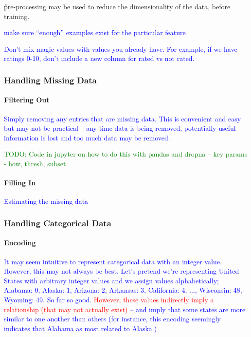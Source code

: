 
\r{pre-processing may be used to reduce the dimensionality of the data, before training.}

\textcolor{blue}{make sure ``enough'' examples exist for the particular feature}

\textcolor{blue}{Don't mix magic values with values you already have. For example, if we have ratings 0-10, don't include a new column for rated vs not rated.}

\subsubsection{Handling Missing Data}

\paragraph{Filtering Out}

\textcolor{blue}{Simply removing any entries that are missing data. This is convenient and easy but may not be practical -- any time data is being removed, potentially useful information is lost and too much data may be removed.}

\textcolor{green}{TODO: Code in jupyter on how to do this with pandas and dropna -- key params - how, thresh, subset}

\paragraph{Filling In}

\textcolor{blue}{Estimating the missing data}

\subsubsection{Handling Categorical Data}

\paragraph{Encoding}

\textcolor{blue}{It may seem intuitive to represent categorical data with an integer value. However, this may not always be best. Let's pretend we're representing United States with arbitrary integer values and we assign values alphabetically; Alabama: 0, Alaska: 1, Arizona: 2, Arkansas: 3, California: 4, ..., Wisconsin: 48, Wyoming: 49. So far so good. \textcolor{red}{However, these values indirectly imply a relationship (that may not actually exist)} -- and imply that some states are more similar to one another than others (for instance, this encoding seemingly indicates that Alabama as most related to Alaska.) }

